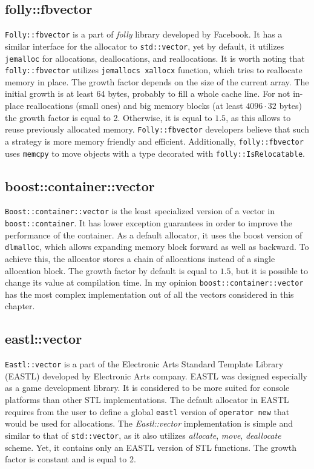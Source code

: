 \documentclass[inz, english, shortabstract]{iithesis}
\begin{document}
\subsection{folly::fbvector}
{\tt Folly::fbvector}\cite{folly::fbvector_impl} is a part of \emph{folly} library developed by Facebook. It has a similar interface for the allocator to {\tt std::vector}, yet by default, it utilizes {\tt jemalloc} for allocations, deallocations, and reallocations\cite{folly::fbvector_description}. It is worth noting that {\tt folly::fbvector} utilizes {\tt jemallocs xallocx} function, which tries to reallocate memory in place. The growth factor depends on the size of the current array. The initial growth is at least 64 bytes, probably to fill a whole cache line. For not in-place reallocations (small ones) and big memory blocks (at least $4096 \cdot 32$ bytes) the growth factor is equal to 2. Otherwise, it is equal to $1.5$, as this allows to reuse previously allocated memory. {\tt Folly::fbvector} developers believe that such a strategy is more memory friendly and efficient\cite{folly::fbvector_description}. Additionally, {\tt folly::fbvector} uses {\tt memcpy} to move objects with a type decorated with {\tt folly::IsRelocatable}.

\subsection{boost::container::vector}
{\tt Boost::container::vector}\cite{boost::container::vector_impl} is the least specialized version of a vector in {\tt boost::container}. It has lower exception guarantees in order to improve the performance of the container\cite{boost_exceptions}. As a default allocator, it uses the boost version of {\tt dlmalloc}\cite{dlmalloc}, which allows expanding memory block forward as well as backward. To achieve this, the allocator stores a chain of allocations instead of a single allocation block. The growth factor by default is equal to $1.5$, but it is possible to change its value at compilation time. In my opinion {\tt boost::container::vector} has the most complex implementation out of all the vectors considered in this chapter.

\subsection{eastl::vector}
{\tt Eastl::vector}\cite{eastl::vector_impl} is a part of the Electronic Arts Standard Template Library (EASTL) developed by Electronic Arts company. EASTL was designed especially as a game development library. It is considered to be more suited for console platforms\cite{eastl_faq} than other STL implementations. The default allocator in EASTL requires from the user to define a global {\tt eastl} version of {\tt operator new} that would be used for allocations. The {\it Eastl::vector} implementation is simple and similar to that of {\tt std::vector}, as it also utilizes \emph{allocate}, \emph{move}, \emph{deallocate} scheme. Yet, it contains only an EASTL version of STL functions. The growth factor is constant and is equal to 2.
\end{document}
